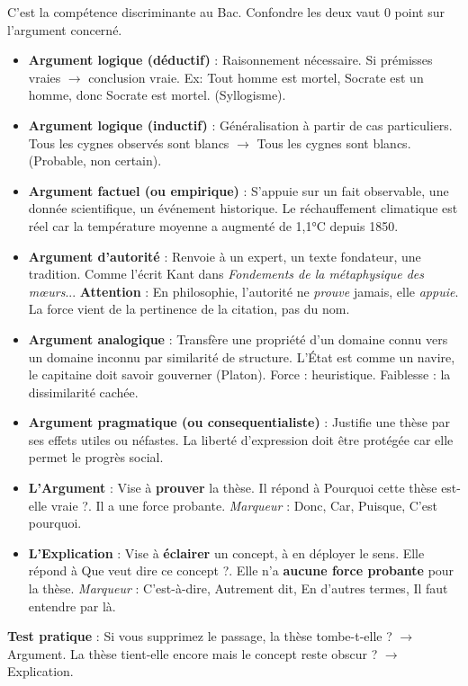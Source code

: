 \documentclass[11pt]{article}
\begin{document}
C'est la compétence discriminante au Bac. Confondre les deux vaut 0 point sur l'argument concerné.

\begin{definition}
\begin{itemize}
    \item \textbf{Argument logique (déductif)} : Raisonnement nécessaire. Si prémisses vraies $\rightarrow$ conclusion vraie. Ex: \og{}Tout homme est mortel, Socrate est un homme, donc Socrate est mortel.\fg{} (Syllogisme).
    \item \textbf{Argument logique (inductif)} : Généralisation à partir de cas particuliers. \og{}Tous les cygnes observés sont blancs $\rightarrow$ Tous les cygnes sont blancs.\fg{} (Probable, non certain).
    \item \textbf{Argument factuel (ou empirique)} : S'appuie sur un fait observable, une donnée scientifique, un événement historique. \og{}Le réchauffement climatique est réel car la température moyenne a augmenté de 1,1°C depuis 1850.\fg{}
    \item \textbf{Argument d'autorité} : Renvoie à un expert, un texte fondateur, une tradition. \og{}Comme l'écrit Kant dans \emph{Fondements de la métaphysique des mœurs}...\fg{} \textbf{Attention} : En philosophie, l'autorité ne \emph{prouve} jamais, elle \emph{appuie}. La force vient de la pertinence de la citation, pas du nom.
    \item \textbf{Argument analogique} : Transfère une propriété d'un domaine connu vers un domaine inconnu par similarité de structure. \og{}L'État est comme un navire, le capitaine doit savoir gouverner (Platon).\fg{} Force : heuristique. Faiblesse : la dissimilarité cachée.
    \item \textbf{Argument pragmatique (ou consequentialiste)} : Justifie une thèse par ses effets utiles ou néfastes. \og{}La liberté d'expression doit être protégée car elle permet le progrès social.\fg{}
\end{itemize}
\end{definition}

\begin{propriete}
\begin{itemize}
    \item \textbf{L'Argument} : Vise à \textbf{prouver} la thèse. Il répond à \og{}Pourquoi cette thèse est-elle vraie ?\fg{}. Il a une force probante. \emph{Marqueur} : \og{}Donc\fg{}, \og{}Car\fg{}, \og{}Puisque\fg{}, \og{}C'est pourquoi\fg{}.
    \item \textbf{L'Explication} : Vise à \textbf{éclairer} un concept, à en déployer le sens. Elle répond à \og{}Que veut dire ce concept ?\fg{}. Elle n'a \textbf{aucune force probante} pour la thèse. \emph{Marqueur} : \og{}C'est-à-dire\fg{}, \og{}Autrement dit\fg{}, \og{}En d'autres termes\fg{}, \og{}Il faut entendre par là\fg{}.
\end{itemize}
\textbf{Test pratique} : Si vous supprimez le passage, la thèse tombe-t-elle ? $\rightarrow$ Argument. La thèse tient-elle encore mais le concept reste obscur ? $\rightarrow$ Explication.
\end{propriete}
\end{document}
